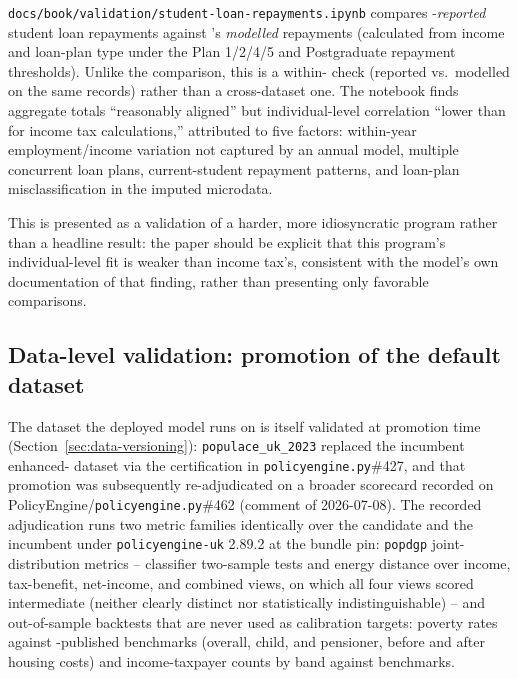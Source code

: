 \texttt{docs/book/validation/student-loan-repayments.ipynb} compares
\frs{}-\emph{reported} student loan repayments against \policyengine{}'s
\emph{modelled} repayments (calculated from income and loan-plan type under
the Plan 1/2/4/5 and Postgraduate repayment thresholds). Unlike the \spi{}
comparison, this is a within-\frs{} check (reported vs.\ modelled on the
same records) rather than a cross-dataset one. The notebook finds aggregate
totals ``reasonably aligned'' but individual-level correlation
``lower than for income tax calculations,'' attributed to five factors:
within-year employment/income variation not captured by an annual model,
multiple concurrent loan plans, current-student repayment patterns, and
loan-plan misclassification in the imputed microdata. 

This is presented as a validation of a harder, more idiosyncratic program
rather than a headline result: the paper should be explicit that this
program's individual-level fit is weaker than income tax's, consistent with
the model's own documentation of that finding, rather than presenting only
favorable comparisons.

\subsection{Data-level validation: promotion of the default dataset}
\label{sec:validation-promotion}

The dataset the deployed model runs on is itself validated at promotion
time (Section~\ref{sec:data-versioning}): \texttt{populace\_uk\_2023}
replaced the incumbent enhanced-\frs{} dataset via the certification in
\texttt{policyengine.py}\#427, and that promotion was subsequently
re-adjudicated on a broader scorecard recorded on
PolicyEngine/\texttt{policyengine.py}\#462 (comment of 2026-07-08). The
recorded adjudication runs two metric families identically over the
candidate and the incumbent under \texttt{policyengine-uk} 2.89.2 at the
bundle pin: \texttt{popdgp} joint-distribution metrics -- classifier
two-sample tests and energy distance over income, tax-benefit, net-income,
and combined views, on which all four views scored intermediate (neither
clearly distinct nor statistically indistinguishable) -- and out-of-sample
backtests that are never used as calibration targets: poverty rates
against \hbai{}-published benchmarks (overall, child, and pensioner,
before and after housing costs) and income-taxpayer counts by band against
\hmrc{} benchmarks.

